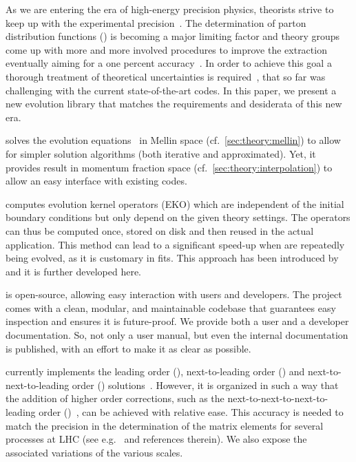 
As we are entering the era of high-energy precision physics, theorists strive
to keep up with the experimental precision~\cite{Gao:2017yyd}.
The determination of parton distribution functions (\pdfs) is becoming
a major limiting factor and theory groups come up with more and more
involved procedures to improve the extraction~\cite{NNPDF:2017mvq,Hou:2019efy,Bailey:2020ooq}
eventually aiming for a one percent accuracy~\cite{NNPDF:2021njg}.
In order to achieve this goal a thorough treatment of theoretical
uncertainties is required~\cite{AbdulKhalek:2019ihb},
that so far was challenging with the current
state-of-the-art codes.
In this paper, we present \eko{} a new \qcd{} evolution library that matches
the requirements and desiderata of this new era.

\eko{} solves the evolution
equations~\cite{Altarelli:1977zs,Gribov:1972ri,Dokshitzer:1977sg} in Mellin
space (cf.\ \cref{sec:theory:mellin}) to allow for simpler solution algorithms
(both iterative and approximated).
Yet, it provides result in momentum fraction space (cf.\
\cref{sec:theory:interpolation}) to allow an easy interface with existing
codes.

\eko{} computes evolution kernel operators (EKO) which are independent of
the initial boundary conditions but only depend on the given theory settings.
The operators can thus be computed once, stored on disk and then reused in the
actual application. This method can lead to a significant speed-up when \pdfs
are repeatedly being evolved, as it is customary in \pdf{} fits.
This approach has been introduced by \fk{}~\cite{Ball:2008by,Ball:2010de,DelDebbio:2007ee}
and it is further developed here.

\eko{} is open-source, allowing easy interaction with users
and developers.
The project comes with a clean, modular, and maintainable codebase that guarantees
easy inspection and ensures it is future-proof.
We provide both a user and a developer documentation. So, not only a user
manual, but even the internal documentation is published, with an effort to make
it as clear as possible.

\eko{} currently implements the leading order (\lo{}),
next-to-leading order (\nlo{}) and next-to-next-to-leading order (\nnlo{})
solutions~\cite{Vogt:2004mw,Moch:2004pa,Blumlein:2021enk}.
However, it is organized in such a way that the addition of higher order corrections,
such as the next-to-next-to-next-to-leading order (\nnnlo{})~\cite{Moch:2021qrk},
can be achieved with relative ease.
This accuracy is needed to match the precision in the determination of the
matrix elements for several processes at LHC (see e.g.\ \cite{Duhr:2021vwj} and
references therein).
We also expose the associated variations of the various scales.

